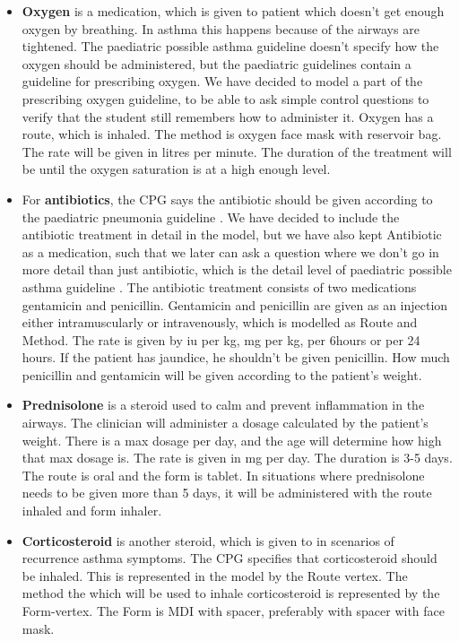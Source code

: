 \begin{itemize}
	\item \textbf{Oxygen} is a medication, which is given to patient which doesn't get enough oxygen by breathing. In asthma this happens because of the airways are tightened. The paediatric possible asthma guideline \parencite{RepublicofKeny2016} doesn't specify how the oxygen should be administered, but the paediatric guidelines contain a guideline for prescribing oxygen\parencite{RepublicofKeny2016}. We have decided to model a part of the prescribing oxygen guideline, to be able to ask simple control questions to verify that the student still remembers how to administer it. Oxygen has a route, which is inhaled. The method is oxygen face mask with reservoir bag. The rate will be given in litres per minute. The duration of the treatment will be until the oxygen saturation is at a high enough level.
	
	\item For \textbf{antibiotics}, the CPG says the antibiotic should be given according to the paediatric pneumonia guideline \parencite{RepublicofKeny2016}. We have decided to include the antibiotic treatment in detail in the model, but we have also kept Antibiotic as a medication, such that we later can ask a question where we don't go in more detail than just antibiotic, which is the detail level of paediatric possible asthma guideline \parencite{RepublicofKeny2016}. The antibiotic treatment consists of two medications gentamicin and penicillin. Gentamicin and penicillin are given as an injection either intramuscularly or intravenously, which is modelled as Route and Method. The rate is given by iu per kg, mg per kg, per 6hours or per 24 hours. If the patient has jaundice, he shouldn't be given penicillin. How much penicillin and gentamicin will be given according to the patient's weight.
	
	\item \textbf{Prednisolone} is a steroid used to calm and prevent inflammation in the airways. The clinician will administer a dosage calculated by the patient's weight. There is a max dosage per day, and the age will determine how high that max dosage is. The rate is given in mg per day. The duration is 3-5 days. The route is oral and the form is tablet. In situations where prednisolone needs to be given more than 5 days, it will be administered with the route inhaled and form inhaler.
	
	\item \textbf{Corticosteroid} is another steroid, which is given to in scenarios of recurrence asthma symptoms. The CPG specifies that corticosteroid should be inhaled. This is represented in the model by the Route vertex. The method the which will be used to inhale corticosteroid is represented by the Form-vertex. The Form is MDI with spacer, preferably with spacer with face mask. 
	

\end{itemize}
